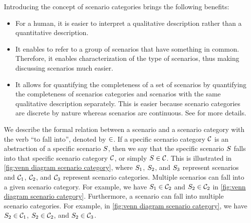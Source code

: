 Introducing the concept of scenario categories brings the following benefits:
\begin{itemize}
	\item For a human, it is easier to interpret a qualitative description rather than a quantitative description.
	\item It enables to refer to a group of scenarios that have something in common. Therefore, it enables characterization of the type of scenarios, thus making discussing scenarios much easier.
	\cbstartd
	\item It allows for quantifying the completeness of a set of scenarios by quantifying the completeness of scenarios categories and scenarios with the same qualitative description separately. This is easier because scenario categories are discrete by nature whereas scenarios are continuous. See \cite{degelder2019completeness} for more details.
	\cbend
\end{itemize}

We describe the formal relation between a scenario and a scenario category with the verb ``to fall into'', denoted by $\in$. If a specific scenario category $\mathcal{C}$ is an abstraction of a specific scenario $S$, then we say that the specific scenario $S$ falls into that specific scenario category $\mathcal{C}$, or simply $S \in \mathcal{C}$. \cbstartc This is illustrated in \cref{fig:venn diagram scenario category}, where $S_{1}$, $S_{2}$, and $S_{3}$ represent scenarios and $\mathcal{C}_{1}$, $\mathcal{C}_{2}$, and $\mathcal{C}_{3}$ represent scenario categories. Multiple scenarios can fall into a given scenario category. For example, we have $S_{1} \in \mathcal{C}_{2}$ and $S_{2} \in \mathcal{C}_{2}$ in \cref{fig:venn diagram scenario category}. 
Furthermore, a scenario can fall into multiple scenario categories. For example, in \cref{fig:venn diagram scenario category}, we have $S_{2} \in \mathcal{C}_{1}$, $S_{2} \in \mathcal{C}_{2}$, and $S_{2} \in \mathcal{C}_{3}$.
\cbend

